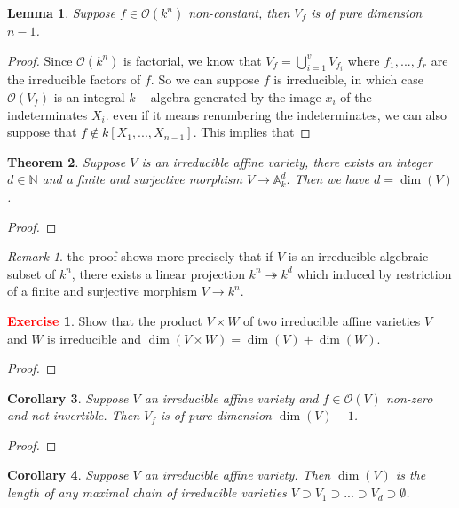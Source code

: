 \documentclass[12pt,a4paper,english]{article}
\theoremstyle{plain}
\newtheorem{thm}{Theorem}[section]
\newtheorem{lem}[thm]{Lemma}
\newtheorem{coro}[thm]{Corollary}
\theoremstyle{definition}
\newtheorem{exercise}{\textbf{\textcolor{red}{Exercise}}}
\theoremstyle{remark}
\newtheorem*{rem}{Remark}
\begin{document}
\begin{lem}
Suppose $f\in\mathcal{O}(k^{n})$ non-constant, then $V_{f}$ is of pure dimension $n-1$.
\end{lem}
\begin{proof}
Since $\mathcal{O}(k^{n})$ is  factorial, we know that $V_{f}=\bigcup^{v}_{i=1}V_{f_{i}}$ where $f_{1},...,f_{r}$ are the irreducible factors of $f$. So we can suppose $f$ is irreducible, in which case $\mathcal{O}(V_{f})$ is an integral $k-$algebra generated by the image $x_{i}$ of the indeterminates $X_{i}$. even if it means renumbering the indeterminates, we can also suppose that $f\not\in k[X_{1},...,X_{n-1}]$. This implies that 
\end{proof}
\begin{thm}
Suppose $V$ is an irreducible affine variety, there exists an integer $d\in\mathbb{N}$ and a finite and surjective morphism $V\rightarrow \mathbb{A}^{d}_{k}$. Then we have $d=\dim(V)$.
\end{thm}
\begin{proof}

\end{proof}
\begin{rem}
the proof shows more precisely that if $V$ is an irreducible algebraic subset of $k^{n}$, there exists a linear projection $k^{n}\twoheadrightarrow k^{d}$ which induced by restriction of a finite and surjective morphism $V\rightarrow k^{n}$.  
\end{rem}
\begin{exercise}
Show that the product $V\times W$ of two irreducible affine varieties $V$ and $W$ is irreducible and $\dim(V\times W)=\dim(V)+\dim(W)$.
\end{exercise}
\begin{tcolorbox}
\begin{proof}

\end{proof}
\end{tcolorbox}
\begin{coro}
Suppose $V$ an irreducible affine variety and $f\in\mathcal{O}(V)$ non-zero and not invertible. Then $V_{f}$ is of pure dimension $\dim(V)-1$.
\end{coro}
\begin{proof}

\end{proof}
\begin{coro}
Suppose $V$ an irreducible affine variety. Then $\dim(V)$ is the length of any maximal chain of irreducible varieties $V\supset V_{1}\supset...\supset V_{d}\supset \emptyset$.
\end{coro}
\end{document}
